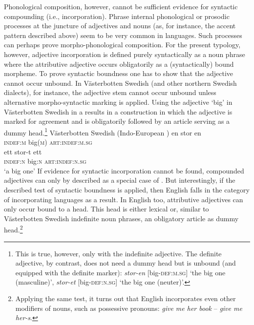 Phonological composition, however, cannot be sufficient evidence for syntactic compounding (i.e., incorporation). Phrase internal phonological or prosodic processes at the juncture of adjectives and nouns (as, for instance, the accent pattern described above) seem to be very common in languages. Such processes can perhaps prove morpho-phonological composition. For the present typology, however, adjective incorporation is defined purely syntactically as a noun phrase where the attributive adjective occurs obligatorily as a (syntactically) bound morpheme. To prove syntactic boundness one has to show that the adjective cannot occur unbound. In Västerbotten Swedish (and other northern Swedish dialects), for instance, the adjective stem cannot occur unbound unless alternative morpho-syntactic marking is applied. Using the adjective ‘big’ in Västerbotten Swedish in a  results in a construction in which the adjective is marked for agreement and is obligatorily followed by an article serving as a dummy head.\footnote{This is true, however, only with the indefinite adjective. The definite adjective, by contrast, does not need a dummy head but is unbound (and equipped with the definite marker): \textit{stor-en} [big-\textsc{def:m.sg}] ‘the big one (masculine)’, \textit{stor-et} [big-\textsc{def:n.sg}] ‘the big one (neuter)’.}
\ea 
\label{bondska headless}
{\rm Västerbotten Swedish (Indo-European \citealt{larsson1929})}
\ea
\gll 	en stor en\\	
	\textsc{indef:m} big(\textsc{m}) \textsc{art:indef:m.sg}\\
\ex
\gll 	ett stor-t ett\\	
	\textsc{indef:n} big:\textsc{n} \textsc{art:indef:n.sg}\\
\glt	‘a big one’
\z
\z
If evidence for syntactic incorporation cannot be found, compounded adjectives can only by described as a special case of . But interestingly, if the described test of syntactic boundness is applied, then English falls in the category of incorporating languages as a result. In English too, attributive adjectives can only occur bound to a head. This head is either lexical or, similar to Västerbotten Swedish indefinite noun phrases, an obligatory article as dummy head.\footnote{Applying the same test, it turns out that English incorporates even other modifiers of nouns, such as possessive pronouns: \textit{give me her book} – \textit{give me her-s}.}

